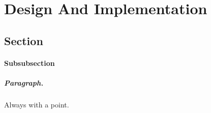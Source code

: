 \chapter{Design And Implementation}
\section{Section}
%
\subsubsection{Subsubsection}

\paragraph{Paragraph.} Always with a point.


